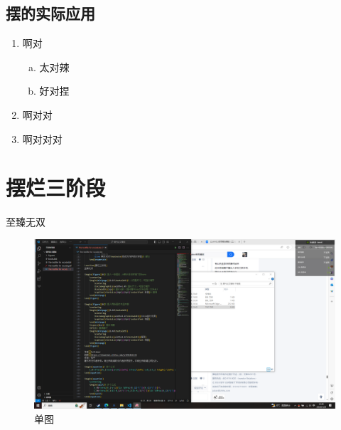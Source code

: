 \documentclass[12pt,a4paper]{article}%
\begin{document}
\subsection{摆的实际应用}
	\begin{enumerate}[1.]%
    \item 啊对
	    \begin{enumerate}[(a)]%
			\item 太对辣
			\item 好对捏
    	\end{enumerate}
    \item 啊对对
	\item 啊对对对
    \end{enumerate}

\section{摆烂三阶段}
至臻无双

\begin{figure}[H]%
	\centering
	\begin{minipage}{0.83\textwidth}%
		\centering
		\includegraphics[width=1.0%
		\textwidth]{1}%
		\caption{\fontsize{10pt}{15pt}\selectfont 单图}%
	\end{minipage}
\end{figure}
\end{document}

